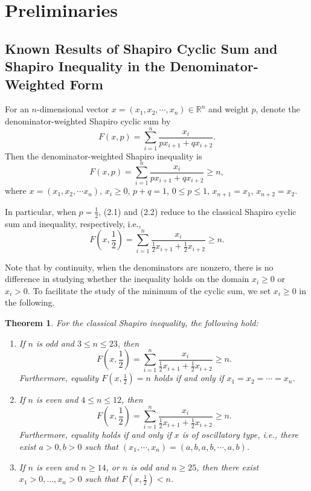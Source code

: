 \documentclass[a4paper,fleqn,numbers]{cas-sc}
\newtheorem{theorem}{Theorem}[section]
\begin{document}
	\section{Preliminaries}\label{}
	
	\subsection{Known Results of Shapiro Cyclic Sum and Shapiro Inequality in the Denominator-Weighted Form}
	
	For an $n$-dimensional vector $x=(x_1,x_2,\cdots,x_n)\in \mathbb{R}^n$ and weight $p$, denote the denominator-weighted Shapiro cyclic sum by
	\[
	F(x,p)=\sum_{i=1}^{n} \frac{x_i}{px_{i+1}+qx_{i+2}}.
	\tag{2.1}	
	\]
	Then the denominator-weighted Shapiro inequality is
	\[
	F(x,p)=\sum_{i=1}^{n} \frac{x_i}{px_{i+1}+qx_{i+2}}\geq n,
	\tag{2.2}
	\]
	where $x=(x_1,x_2,\cdots x_n)$, $x_i\geq 0$, $p+q=1$, $0\leq p \leq 1$, $x_{n+1}=x_1$, $x_{n+2}=x_2$.
	
	In particular, when $p=\frac{1}{2}$, (2.1) and (2.2) reduce to the classical Shapiro cyclic sum and inequality, respectively, i.e.,
	\[
	F\left(x,\frac{1}{2}\right)=\sum_{i=1}^{n} \frac{x_i}{\frac{1}{2} x_{i+1}+\frac{1}{2}x_{i+2}}\geq n.
	\]
	
	Note that by continuity, when the denominators are nonzero, there is no difference in studying whether the inequality holds on the domain $x_i\geq 0$ or $x_i > 0$. To facilitate the study of the minimum of the cyclic sum, we set $x_i\geq 0$ in the following.
	
	\begin{theorem}
		For the classical Shapiro inequality, the following hold:
		\begin{enumerate}
			\item If $n$ is odd and $3 \leq n \leq 23$, then
			\[
			F\left(x,\frac{1}{2}\right)=\sum_{i=1}^{n} \frac{x_i}{\frac{1}{2} x_{i+1}+\frac{1}{2}x_{i+2}}\geq n.
			\]
			Furthermore, equality $F\left(x,\frac{1}{2}\right) = n$ holds if and only if $x_1 = x_2 = \cdots = x_n$.
			\item If $n$ is even and $4 \leq n \leq 12$, then
			\[
			F\left(x,\frac{1}{2}\right)=\sum_{i=1}^{n} \frac{x_i}{\frac{1}{2} x_{i+1}+\frac{1}{2}x_{i+2}}\geq n.
			\]
			Furthermore, equality holds if and only if $x$ is of oscillatory type, i.e., there exist $a>0,b>0$ such that $(x_1,\cdots,x_n) = (a,b,a,b,\cdots,a,b)$.
			\item If $n$ is even and $n \geq 14$, or $n$ is odd and $n \geq 25$, then there exist $x_1>0,\ldots,x_n>0$ such that $F\left(x,\frac{1}{2}\right)<n$.
		\end{enumerate}
	\end{theorem}
	
\end{document}

